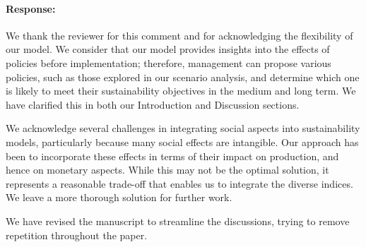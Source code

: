 \documentclass[11pt]{article}
\newcommand{\AuthorResponse}{\paragraph*{Response:}}
\begin{document}
    \AuthorResponse{We thank the reviewer for this comment and for acknowledging the flexibility of our model. We consider that our model provides insights into the effects of policies before implementation; therefore, management can propose various policies, such as those explored in our scenario analysis, and determine which one is likely to meet their sustainability objectives in the medium and long term. We have clarified this in both our Introduction and Discussion sections.

    We acknowledge several challenges in integrating social aspects into sustainability models, particularly because many social effects are intangible. Our approach has been to incorporate these effects in terms of their impact on production, and hence on monetary aspects. While this may not be the optimal solution, it represents a reasonable trade-off that enables us to integrate the diverse indices. We leave a more thorough solution for further work.
    
    We have revised the manuscript to streamline the discussions, trying to remove repetition throughout the paper.}

    




\end{document}
